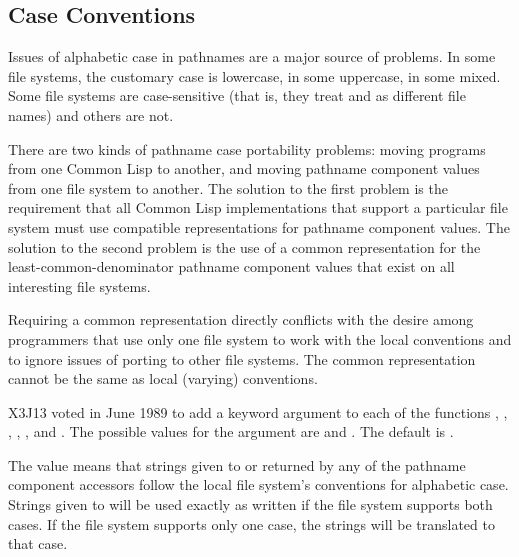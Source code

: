 \begin{newer}
\subsection{Case Conventions}
\label{PATHNAME-COMPONENT-CASE-SECTION}

  Issues of alphabetic case in pathnames are a major source of problems.
  In some file systems, the customary case is lowercase, in some uppercase,
  in some mixed.  Some file systems are case-sensitive (that is, they treat
   and  as different file names) and others are not.

  There are two kinds of pathname case portability problems: moving
  programs from one Common Lisp to another, and moving pathname component
  values from one file system to another.  The solution to the first problem
  is the requirement that all
  Common Lisp implementations that support a particular file system must
  use compatible representations for pathname component values.  The solution to
  the second problem is the use of a common representation for the
  least-common-denominator pathname component values that exist on all
  interesting file systems.

  Requiring a common representation directly conflicts with the
  desire among programmers that use only one file system to work with the
  local conventions and to ignore issues of porting to other file
  systems.  The common representation cannot be the same as local (varying)
  conventions.

X3J13 voted in June 1989  to
add a keyword argument  to each of the functions
  , ,
  , , ,
  and .
  The possible values for the argument are  and .
  The default is .

  The value  means that strings given to 
  or returned by any of the pathname component accessors
  follow the local file system's conventions for alphabetic case.
  Strings given to  will be used exactly as written if
  the file system supports both cases.  If the file system
  supports only one case, the strings will be translated to that case.


\end{newer}

